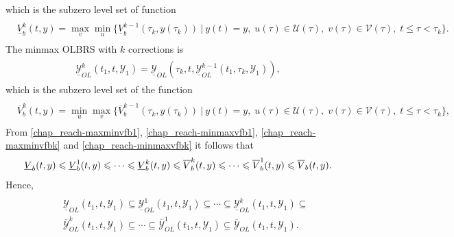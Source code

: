\documentclass[letterpaper,10pt,english]{sphinxmanual}
\begin{document}
which is the subzero level set of function
\label{chap_reach:equation-maxminvfbk}\begin{gather}
\begin{split}\begin{aligned}
\underline{V}^k_b(t, y) =  \max_v\min_u\{\underline{V}^{k-1}_b(\tau_k, y(\tau_k)) ~|~
y(t)=y, \; u(\tau)\in{\mathcal U}(\tau), \;
v(\tau)\in{\mathcal V}(\tau), \; t\leqslant\tau<\tau_k\}.
\end{aligned}\end{split}\label{chap_reach-maxminvfbk}
\end{gather}
The minmax OLBRS with \(k\) corrections is
\label{chap_reach:equation-minmaxbk}\begin{gather}
\begin{split}\underline{{\mathcal Y}}_{OL}^k(t_1, t, {\mathcal Y}_1) = \underline{{\mathcal Y}}_{OL}(\tau_k, t, \underline{{\mathcal Y}}_{OL}^{k-1}(t_1, \tau_k, {\mathcal Y}_1)),\end{split}\label{chap_reach-minmaxbk}
\end{gather}
which is the subzero level set of the function
\label{chap_reach:equation-minmaxvfbk}\begin{gather}
\begin{split}\begin{aligned}
\overline{V}^k_b(t, y) =  \min_u\max_v\{\overline{V}^{k-1}_b(\tau_k, y(\tau_k)) ~|~
y(t)=y, \; u(\tau)\in{\mathcal U}(\tau), \;
v(\tau)\in{\mathcal V}(\tau), \; t\leqslant\tau<\tau_k\},
\end{aligned}\end{split}\label{chap_reach-minmaxvfbk}
\end{gather}
From \eqref{chap_reach-maxminvfb1}, \eqref{chap_reach-minmaxvfb1}, \eqref{chap_reach-maxminvfbk} and \eqref{chap_reach-minmaxvfbk}
it follows that
\begin{gather}
\begin{split}\underline{V}_b(t, y) \leqslant\underline{V}^1_b(t, y)\leqslant\cdots
\leqslant\underline{V}^k_b(t, y) \leqslant\overline{V}^k_b(t, y) \leqslant\cdots
\leqslant\overline{V}^1_b(t, y) \leqslant\overline{V}_b(t, y) .\end{split}\notag
\end{gather}
Hence,
\label{chap_reach:equation-olbrsinclusion}\begin{gather}
\begin{split}\begin{aligned}
&&\underline{{\mathcal Y}}_{OL}(t_1, t, {\mathcal Y}_1) \subseteq \underline{{\mathcal Y}}_{OL}^1(t_1, t, {\mathcal Y}_1) \subseteq \cdots
\subseteq \underline{{\mathcal Y}}_{OL}^k(t_1, t, {\mathcal Y}_1) \subseteq \nonumber \\
&&\overline{{\mathcal Y}}_{OL}^k(t_1, t, {\mathcal Y}_1) \subseteq \cdots \subseteq \overline{{\mathcal Y}}_{OL}^1(t_1, t, {\mathcal Y}_1)
\subseteq \overline{{\mathcal Y}}_{OL}(t_1, t, {\mathcal Y}_1) .
\end{aligned}\end{split}\label{chap_reach-olbrsinclusion}
\end{gather}
\end{document}
